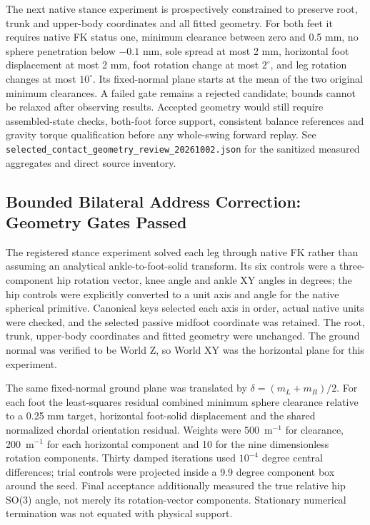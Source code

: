 \documentclass[11pt,a4paper]{article}
\begin{document}
The next native stance experiment is prospectively constrained to preserve
root, trunk and upper-body coordinates and all fitted geometry. For both
feet it requires native FK status one, minimum clearance between zero and
0.5 mm, no sphere penetration below $-0.1$ mm, sole spread at most 2 mm,
horizontal foot displacement at most 2 mm, foot rotation change at most
$2^\circ$, and leg rotation changes at most $10^\circ$. Its fixed-normal
plane starts at the mean of the two original minimum clearances. A failed
gate remains a rejected candidate; bounds cannot be relaxed after observing
results. Accepted geometry would still require assembled-state checks,
both-foot force support, consistent balance references and gravity torque
qualification before any whole-swing forward replay. See
\texttt{selected\_contact\_geometry\_review\_20261002.json} for the
sanitized measured aggregates and direct source inventory.

\subsection{Bounded Bilateral Address Correction: Geometry Gates Passed}
The registered stance experiment solved each leg through native FK rather
than assuming an analytical ankle-to-foot-solid transform. Its six controls
were a three-component hip rotation vector, knee angle and ankle XY angles
in degrees; the hip controls were explicitly converted to a unit axis and
angle for the native spherical primitive. Canonical keys selected each axis
in order, actual native units were checked, and the selected passive midfoot
coordinate was retained. The root, trunk, upper-body coordinates and fitted
geometry were unchanged. The ground normal was verified to be World Z, so
World XY was the horizontal plane for this experiment.

The same fixed-normal ground plane was translated by
$\delta=(m_L+m_R)/2$. For each foot the least-squares residual combined
minimum sphere clearance relative to a 0.25 mm target, horizontal
foot-solid displacement and the shared normalized chordal orientation
residual. Weights were 500~m$^{-1}$ for clearance, 200~m$^{-1}$ for each
horizontal component and 10 for the nine dimensionless rotation
components. Thirty damped iterations used $10^{-4}$ degree central
differences; trial controls were projected inside a 9.9 degree component
box around the seed. Final acceptance additionally measured the true
relative hip SO(3) angle, not merely its rotation-vector components.
Stationary numerical termination was not equated with physical support.
\end{document}
